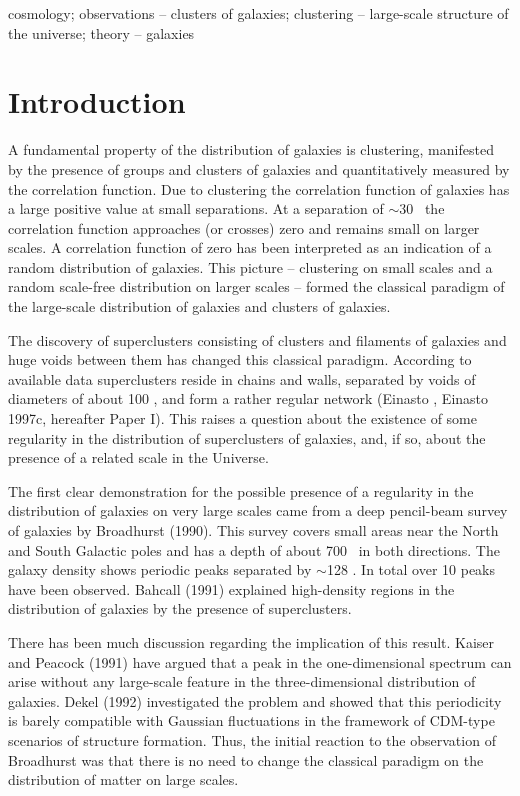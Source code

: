 \begin{keywords}
cosmology; observations -- clusters of galaxies;
clustering -- large-scale structure of the universe; theory -- galaxies
\end{keywords}

\section{Introduction}

A fundamental property of the distribution of galaxies is clustering,
manifested by the presence of groups and clusters of galaxies and
quantitatively measured by the correlation function. Due to clustering the
correlation function of galaxies has a large positive value at small
separations. At a separation of $\sim 30$ \Mpc\ the correlation function
approaches (or crosses) zero and remains small on larger scales. A correlation
function of zero has been interpreted as an indication of a random
distribution of galaxies.  This picture -- clustering on small scales and a
random scale-free distribution on larger scales -- formed the classical
paradigm of the large-scale distribution of galaxies and clusters of galaxies.

The discovery of superclusters consisting of clusters and filaments of
galaxies and huge voids between them has changed this classical
paradigm.  According to available data superclusters reside in chains
and walls, separated by voids of diameters of about 100 \Mpc, and form
a rather regular network (Einasto , Einasto \etal 1997c,
hereafter Paper I).  This raises a question about the existence of
some regularity in the distribution of superclusters of galaxies, and,
if so, about the presence of a related scale in the Universe.


The first clear demonstration for the possible presence of a
regularity in the distribution of galaxies on very large scales came
from a deep pencil-beam survey of galaxies by Broadhurst \etal (1990).
This survey covers small areas near the North and South Galactic poles
and has a depth of about 700 \Mpc\ in both directions.  The galaxy
density shows periodic peaks separated by $\sim$128 \Mpc.  In total
over 10 peaks have been observed. Bahcall (1991) explained
high-density regions in the distribution of galaxies by the presence
of superclusters.

There has been much discussion regarding the implication of this
result.  Kaiser and Peacock (1991) have argued that a peak in the
one-dimensional spectrum can arise without any large-scale feature in
the three-dimensional distribution of galaxies. Dekel \etal (1992)
investigated the problem and showed that this periodicity is barely
compatible with Gaussian fluctuations in the framework of CDM-type
scenarios of structure formation. Thus, the initial reaction to the
observation of Broadhurst \etal was that there is no need to change
the classical paradigm on the distribution of matter on large scales.

